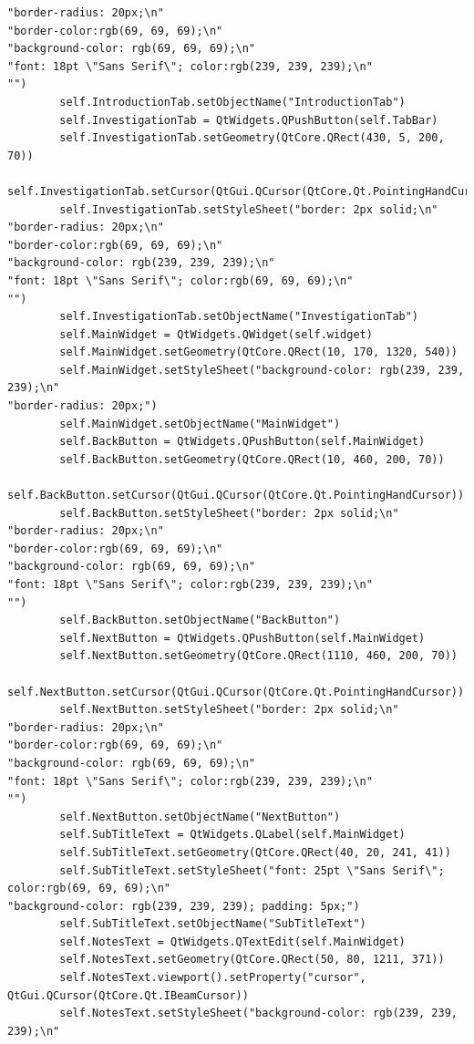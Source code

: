 \documentclass[12pt]{article}
\begin{document}
\begin{lstlisting}
"border-radius: 20px;\n"
"border-color:rgb(69, 69, 69);\n"
"background-color: rgb(69, 69, 69);\n"
"font: 18pt \"Sans Serif\"; color:rgb(239, 239, 239);\n"
"")
        self.IntroductionTab.setObjectName("IntroductionTab")
        self.InvestigationTab = QtWidgets.QPushButton(self.TabBar)
        self.InvestigationTab.setGeometry(QtCore.QRect(430, 5, 200, 70))
        self.InvestigationTab.setCursor(QtGui.QCursor(QtCore.Qt.PointingHandCursor))
        self.InvestigationTab.setStyleSheet("border: 2px solid;\n"
"border-radius: 20px;\n"
"border-color:rgb(69, 69, 69);\n"
"background-color: rgb(239, 239, 239);\n"
"font: 18pt \"Sans Serif\"; color:rgb(69, 69, 69);\n"
"")
        self.InvestigationTab.setObjectName("InvestigationTab")
        self.MainWidget = QtWidgets.QWidget(self.widget)
        self.MainWidget.setGeometry(QtCore.QRect(10, 170, 1320, 540))
        self.MainWidget.setStyleSheet("background-color: rgb(239, 239, 239);\n"
"border-radius: 20px;")
        self.MainWidget.setObjectName("MainWidget")
        self.BackButton = QtWidgets.QPushButton(self.MainWidget)
        self.BackButton.setGeometry(QtCore.QRect(10, 460, 200, 70))
        self.BackButton.setCursor(QtGui.QCursor(QtCore.Qt.PointingHandCursor))
        self.BackButton.setStyleSheet("border: 2px solid;\n"
"border-radius: 20px;\n"
"border-color:rgb(69, 69, 69);\n"
"background-color: rgb(69, 69, 69);\n"
"font: 18pt \"Sans Serif\"; color:rgb(239, 239, 239);\n"
"")
        self.BackButton.setObjectName("BackButton")
        self.NextButton = QtWidgets.QPushButton(self.MainWidget)
        self.NextButton.setGeometry(QtCore.QRect(1110, 460, 200, 70))
        self.NextButton.setCursor(QtGui.QCursor(QtCore.Qt.PointingHandCursor))
        self.NextButton.setStyleSheet("border: 2px solid;\n"
"border-radius: 20px;\n"
"border-color:rgb(69, 69, 69);\n"
"background-color: rgb(69, 69, 69);\n"
"font: 18pt \"Sans Serif\"; color:rgb(239, 239, 239);\n"
"")
        self.NextButton.setObjectName("NextButton")
        self.SubTitleText = QtWidgets.QLabel(self.MainWidget)
        self.SubTitleText.setGeometry(QtCore.QRect(40, 20, 241, 41))
        self.SubTitleText.setStyleSheet("font: 25pt \"Sans Serif\"; color:rgb(69, 69, 69);\n"
"background-color: rgb(239, 239, 239); padding: 5px;")
        self.SubTitleText.setObjectName("SubTitleText")
        self.NotesText = QtWidgets.QTextEdit(self.MainWidget)
        self.NotesText.setGeometry(QtCore.QRect(50, 80, 1211, 371))
        self.NotesText.viewport().setProperty("cursor", QtGui.QCursor(QtCore.Qt.IBeamCursor))
        self.NotesText.setStyleSheet("background-color: rgb(239, 239, 239);\n"

\end{lstlisting}
\end{document}
